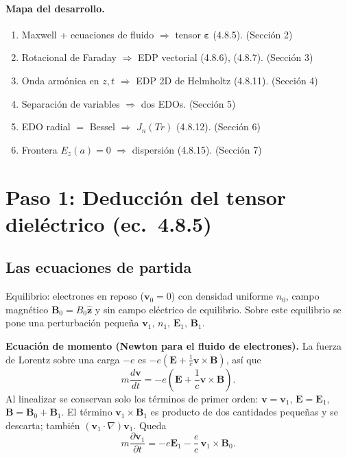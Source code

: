\documentclass[11pt,a4paper]{article}
\newcommand{\E}{\mathbf{E}}
\newcommand{\B}{\mathbf{B}}
\newcommand{\vv}{\mathbf{v}}
\newcommand{\eps}{\boldsymbol{\varepsilon}}
\newcommand{\zz}{\hat{\mathbf{z}}}
\begin{document}
\paragraph{Mapa del desarrollo.}
\begin{enumerate}
\item Maxwell + ecuaciones de fluido $\Rightarrow$ tensor $\eps$ (4.8.5). \hfill(Sección 2)
\item Rotacional de Faraday $\Rightarrow$ EDP vectorial (4.8.6), (4.8.7). \hfill(Sección 3)
\item Onda armónica en $z,t$ $\Rightarrow$ EDP 2D de Helmholtz (4.8.11). \hfill(Sección 4)
\item Separación de variables $\Rightarrow$ dos EDOs. \hfill(Sección 5)
\item EDO radial $=$ Bessel $\Rightarrow$ $J_n(Tr)$ (4.8.12). \hfill(Sección 6)
\item Frontera $E_z(a)=0$ $\Rightarrow$ dispersión (4.8.15). \hfill(Sección 7)
\end{enumerate}

\section{Paso 1: Deducción del tensor dieléctrico (ec.\ 4.8.5)}

\subsection{Las ecuaciones de partida}

Equilibrio: electrones en reposo ($\vv_0=0$) con densidad uniforme $n_0$, campo magnético $\B_0=B_0\zz$ y sin campo eléctrico de equilibrio. Sobre este equilibrio se pone una perturbación pequeña $\vv_1,\,n_1,\,\E_1,\,\B_1$.

\textbf{Ecuación de momento (Newton para el fluido de electrones).} La fuerza de Lorentz sobre una carga $-e$ es $-e\left(\E+\frac{1}{c}\vv\times\B\right)$, así que
\[
m\frac{d\vv}{dt}=-e\left(\E+\frac{1}{c}\vv\times\B\right).
\]
Al linealizar se conservan solo los términos de primer orden: $\vv=\vv_1$, $\E=\E_1$, $\B=\B_0+\B_1$. El término $\vv_1\times\B_1$ es producto de dos cantidades pequeñas y se descarta; también $(\vv_1\cdot\nabla)\vv_1$. Queda
\begin{equation}
m\frac{\partial \vv_1}{\partial t}=-e\E_1-\frac{e}{c}\,\vv_1\times\B_0 .
\label{eq:mom}
\end{equation}
\end{document}
